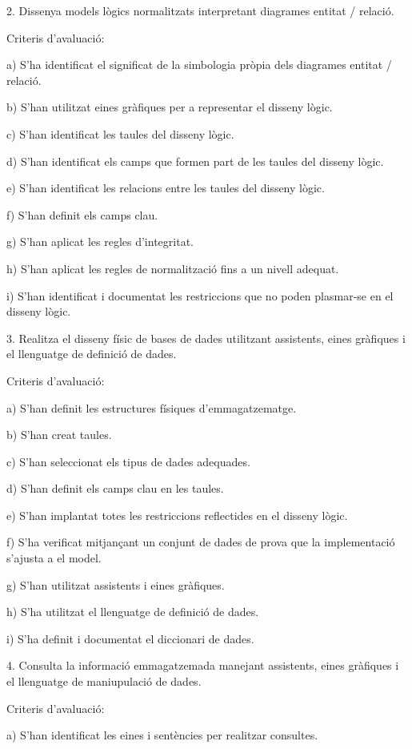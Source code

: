 \documentclass[catalan, a4paper, 12pt, titlepage]{article}
\begin{document}
2. Dissenya models lògics normalitzats interpretant diagrames entitat / relació.

Criteris d'avaluació:

a) S'ha identificat el significat de la simbologia pròpia dels diagrames entitat / relació.

b) S'han utilitzat eines gràfiques per a representar el disseny lògic.

c) S'han identificat les taules del disseny lògic.

d) S'han identificat els camps que formen part de les taules del disseny lògic.

e) S'han identificat les relacions entre les taules del disseny lògic.

f) S'han definit els camps clau.

g) S'han aplicat les regles d'integritat.

h) S'han aplicat les regles de normalització fins a un nivell adequat.

i) S'han identificat i documentat les restriccions que no poden plasmar-se en el disseny lògic.

3. Realitza el disseny físic de bases de dades utilitzant assistents, eines gràfiques i el llenguatge de definició de dades.

Criteris d'avaluació:

a) S'han definit les estructures físiques d'emmagatzematge.

b) S'han creat taules.

c) S'han seleccionat els tipus de dades adequades.

d) S'han definit els camps clau en les taules.

e) S'han implantat totes les restriccions reflectides en el disseny lògic.

f) S'ha verificat mitjançant un conjunt de dades de prova que la implementació s'ajusta a el model.

g) S'han utilitzat assistents i eines gràfiques.

h) S'ha utilitzat el llenguatge de definició de dades.

i) S'ha definit i documentat el diccionari de dades.

4. Consulta la informació emmagatzemada manejant assistents, eines gràfiques i el llenguatge de maniupulació de dades.

Criteris d'avaluació:

a) S'han identificat les eines i sentències per realitzar consultes.
\end{document}
